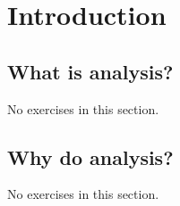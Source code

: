 \chapter{Introduction}

\section{What is analysis?}
No exercises in this section.


\section{Why do analysis?}
No exercises in this section.
